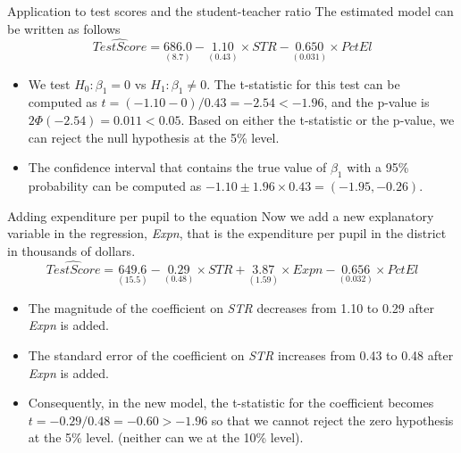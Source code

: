 \documentclass[presentation,10pt]{beamer}
\begin{document}
\begin{frame}[label={sec:org1d41e1f}]{Application to test scores and the student-teacher ratio}
The estimated model can be written as follows
\begin{equation*}
\widehat{TestScore} = \underset{{\displaystyle (8.7)}}{686.0}
- \underset{{\displaystyle (0.43)}}{1.10} \times STR
- \underset{\displaystyle (0.031)}{0.650} \times PctEl
\end{equation*}

\begin{itemize}
\item We test \(H_0: \beta_1 = 0\) vs \(H_1: \beta_1 \neq 0\). The t-statistic
for this test can be computed as \(t = (-1.10-0) / 0.43 = -2.54 <
  -1.96\), and the p-value is \(2\Phi(-2.54) = 0.011 < 0.05\). Based on
either the t-statistic or the p-value, we can reject the null
hypothesis at the 5\% level.

\item The confidence interval that contains the
true value of \(\beta_1\) with a 95\% probability can be computed as
\(-1.10 \pm 1.96 \times 0.43 = (-1.95, -0.26)\).
\end{itemize}
\end{frame}

\begin{frame}[label={sec:org6b12fa1}]{Adding expenditure per pupil to the equation}
Now we add a new explanatory variable in the regression, \emph{Expn}, that
is the expenditure per pupil in the district in thousands of dollars.
\begin{equation*}
\widehat{TestScore} = \underset{{\displaystyle (15.5)}}{649.6}
- \underset{\displaystyle (0.48)}{0.29} \times STR
+ \underset{\displaystyle (1.59)}{3.87} \times Expn
- \underset{\displaystyle (0.032)}{0.656} \times PctEl
\end{equation*}

\begin{itemize}
\item The magnitude of the coefficient on \emph{STR} decreases from 1.10 to
0.29 after \emph{Expn} is added.
\item The standard error of the coefficient on \emph{STR} increases from 0.43
to 0.48 after \emph{Expn} is added.
\item Consequently, in the new model, the t-statistic for the coefficient
becomes \(t = -0.29/0.48 = -0.60 > -1.96\) so that we cannot reject
the zero hypothesis at the 5\% level. (neither can we at the 10\%
level).
\end{itemize}
\end{frame}
\end{document}
